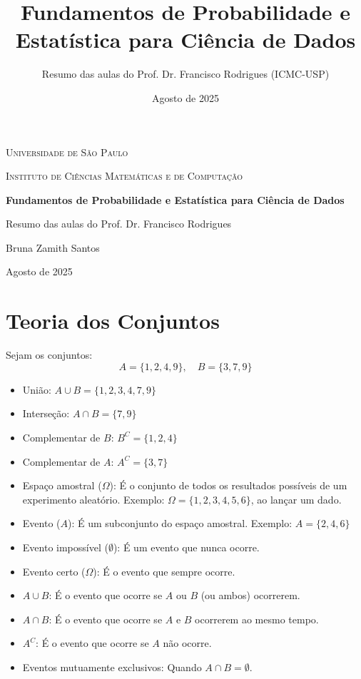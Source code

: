 \documentclass{article}
\title{Fundamentos de Probabilidade e Estatística para Ciência de Dados}
\author{Resumo das aulas do Prof. Dr. Francisco Rodrigues (ICMC-USP)}
\date{Agosto de 2025}
\begin{document}
\begin{titlepage}
    \centering
    \vspace*{3cm}
    {\scshape\LARGE Universidade de São Paulo \par}
    \vspace{1cm}
    {\scshape\Large Instituto de Ciências Matemáticas e de Computação\par}
    \vspace{2.5cm}
    {\huge\bfseries Fundamentos de Probabilidade e Estatística para Ciência de Dados\par}
    \vspace{1cm}
    {\Large Resumo das aulas do Prof. Dr. Francisco Rodrigues\par}
    \vfill
    {\Large Bruna Zamith Santos\par}
    \vspace{0.5cm}
    {\large Agosto de 2025\par}
\end{titlepage}

\tableofcontents
\newpage

\section{Teoria dos Conjuntos}
Sejam os conjuntos:
\[
A = \{1, 2, 4, 9\}, \quad B = \{3, 7, 9\}
\]

\begin{itemize}
  \item União: $A \cup B = \{1, 2, 3, 4, 7, 9\}$
  \item Interseção: $A \cap B = \{7, 9\}$
  \item Complementar de $B$: $B^C = \{1, 2, 4\}$
  \item Complementar de $A$: $A^C = \{3, 7\}$
  \item Espaço amostral ($\Omega$): É o conjunto de todos os resultados possíveis de um experimento aleatório. Exemplo: $\Omega = \{1, 2, 3, 4, 5, 6\}$, ao lançar um dado.
  \item Evento ($A$): É um subconjunto do espaço amostral. Exemplo: $A = \{2, 4, 6\}$
  \item Evento impossível ($\emptyset$): É um evento que nunca ocorre.
  \item Evento certo ($\Omega$): É o evento que sempre ocorre.
  \item $A \cup B$: É o evento que ocorre se $A$ ou $B$ (ou ambos) ocorrerem.
  \item $A \cap B$: É o evento que ocorre se $A$ e $B$ ocorrerem ao mesmo tempo.
  \item $A^C$: É o evento que ocorre se $A$ não ocorre.
  \item Eventos mutuamente exclusivos: Quando $A \cap B = \emptyset$.
\end{itemize}
\end{document}
